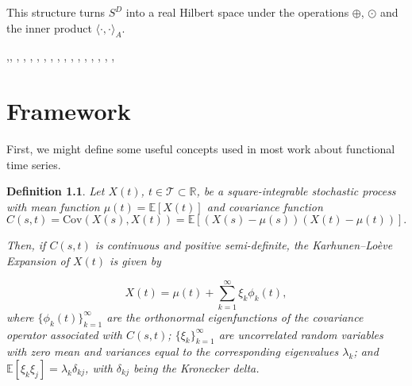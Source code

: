 \documentclass[
	12pt,				%
	oneside,			%
	a4paper,			%
	english,			%
	brazil				%
	]{abntex2ppgsi}
\newtheorem{definition}{Definition}
\begin{document}
This structure turns $S^D$ into a real Hilbert space under the operations $\oplus$, $\odot$ and the inner product $\langle \cdot, \cdot \rangle_A$.







,, , , , , , , , , , , , , , , , 

\chapter{Framework}

First, we might define some useful concepts used in most work about functional time series. 

\begin{definition}
Let \( X(t) \), \( t \in \mathcal{T} \subset \mathbb{R} \), be a square-integrable stochastic process with mean function \( \mu(t) = \mathbb{E}[X(t)] \) and covariance function 
\begin{equation}
C(s, t) = \text{Cov}(X(s), X(t)) = \mathbb{E}[(X(s) - \mu(s))(X(t) - \mu(t))].
\end{equation}

Then, if \( C(s, t) \) is continuous and positive semi-definite, the Karhunen--Lo\`eve Expansion of \( X(t) \) is given by

\begin{equation}
X(t) = \mu(t) + \sum_{k=1}^\infty \xi_k \phi_k(t),
\end{equation}
where \( \{ \phi_k(t) \}_{k=1}^\infty \) are the orthonormal eigenfunctions of the covariance operator associated with \( C(s, t) \); \( \{ \xi_k \}_{k=1}^\infty \) are uncorrelated random variables with zero mean and variances equal to the corresponding eigenvalues \( \lambda_k \); and \( \mathbb{E}[\xi_k \xi_j] = \lambda_k \delta_{kj} \), with \( \delta_{kj} \) being the Kronecker delta.
\end{definition}
\end{document}
